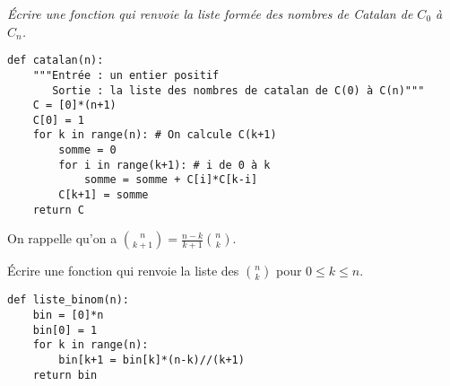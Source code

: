 \begin{Exercise}[title=Nombres de Catalan]\it 
Écrire une fonction  qui renvoie la liste formée des nombres de Catalan de $C_0$ à $C_n$.

\end{Exercise}
\begin{Answer}
\begin{lstlisting}
def catalan(n):
 	"""Entrée : un entier positif
 	   Sortie : la liste des nombres de catalan de C(0) à C(n)"""
    C = [0]*(n+1)
    C[0] = 1
    for k in range(n): # On calcule C(k+1)
        somme = 0
        for i in range(k+1): # i de 0 à k 
            somme = somme + C[i]*C[k-i] 
        C[k+1] = somme 
    return C
\end{lstlisting}
\end{Answer}
\medskip

On rappelle qu'on a $\displaystyle  \binom n{k+1} = \frac{n-k}{k+1} \binom nk$.
\begin{Exercise}[title= Coefficients binomiaux, bis]
Écrire une fonction  qui renvoie la liste des $\binom nk$ pour $0\le k \le n$.
\end{Exercise}
\begin{Answer} 
\begin{lstlisting}
def liste_binom(n):
    bin = [0]*n
    bin[0] = 1
    for k in range(n):
        bin[k+1 = bin[k]*(n-k)//(k+1)
    return bin
\end{lstlisting}
\end{Answer}


